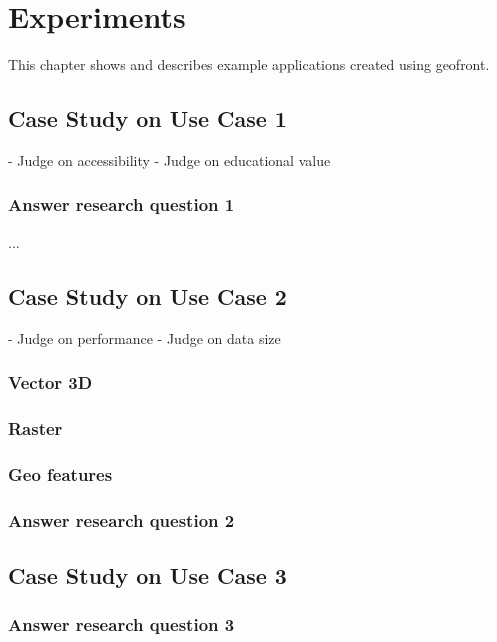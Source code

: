 \chapter{Experiments}%
This chapter shows and describes example applications created using geofront.


\section{Case Study on Use Case 1}%
- Judge on accessibility
- Judge on educational value

\subsection*{Answer research question 1}

...

\section{Case Study on Use Case 2}%
- Judge on performance
- Judge on data size


\subsection{Vector 3D}

\subsection{Raster}

\subsection{Geo features}

\subsection*{Answer research question 2}

\section{Case Study on Use Case 3}%

\subsection*{Answer research question 3}

